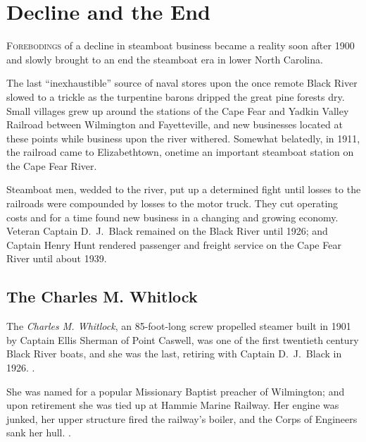 \documentclass[11pt, a5paper, openright]{book}
\newcommand{\steamer}[1]{\textit{#1}\index{#1,~steamer}}
\begin{document}
\chapter{Decline and the End}

\textsc{Forebodings} of a decline in steamboat business became a
reality soon after 1900 and slowly brought to an end the steamboat era
in lower North Carolina.\par

The last ``inexhaustible'' source of naval stores upon the once remote
Black River slowed to a trickle as the turpentine barons dripped the
great pine forests dry.  Small villages grew up around the stations of
the Cape Fear and Yadkin Valley Railroad between Wilmington and
Fayetteville, and new businesses located at these points while
business upon the river withered.  Somewhat belatedly, in 1911, the
railroad came to Elizabethtown, onetime an important steamboat station
on the Cape Fear River.\par

Steamboat men, wedded to the river, put up a determined fight until
losses to the railroads were compounded by losses to the motor truck.
They cut operating costs and for a time found new business in a
changing and growing economy.  Veteran Captain
D.~J.\ Black remained on the Black
River until 1926; and Captain Henry Hunt
rendered passenger and freight service on the Cape Fear River until
about 1939.\par

\section{The Charles M. Whitlock}

The \steamer{Charles M. Whitlock}, an 85-foot-long screw propelled
steamer built in 1901 by Captain Ellis Sherman
of Point Caswell, was one of the first twentieth century Black River
boats, and she was the last, retiring with Captain
D.~J.\ Black in 1926.
\citep[7-5-1901]{ws} \citep{shumpertsb}.\par

She was named for a popular Missionary Baptist preacher of Wilmington;
and upon retirement she was tied up at Hammie Marine
Railway.  Her engine was junked, her
upper structure fired the railway's boiler, and the Corps of Engineers
sank her hull.  \citep{blackj}\citep{wardmb}.\par
\end{document}
